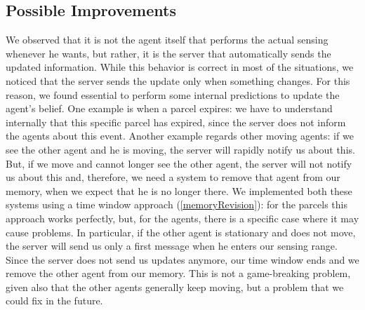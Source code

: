     \subsection{Possible Improvements}
        We observed that it is not the agent itself that performs the actual sensing whenever he wants, but rather, it is the server that automatically sends the updated information. While this behavior is correct in most of the situations, we noticed that the server sends the update only when something changes. For this reason, we found essential to perform some internal predictions to update the agent's belief. One example is when a parcel expires: we have to understand internally that this specific parcel has expired, since the server does not inform the agents about this event. Another example regards other moving agents: if we see the other agent and he is moving, the server will rapidly notify us about this. But, if we move and cannot longer see the other agent, the server will not notify us about this and, therefore, we need a system to remove that agent from our memory, when we expect that he is no longer there. We implemented both these systems using a time window approach (\ref{memoryRevision}): for the parcels this approach works perfectly, but, for the agents, there is a specific case where it may cause problems. In particular, if the other agent is stationary and does not move, the server will send us only a first message when he enters our sensing range. Since the server does not send us updates anymore, our time window ends and we remove the other agent from our memory. This is not a game-breaking problem, given also that the other agents generally keep moving, but a problem that we could fix in the future.

